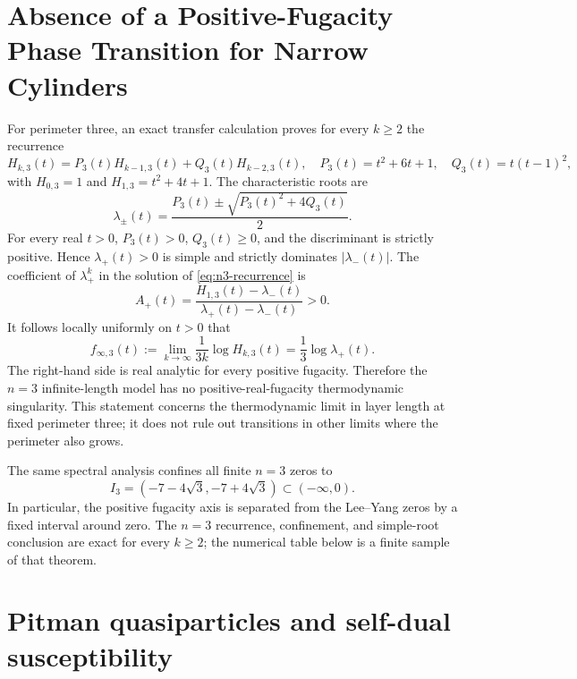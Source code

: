 \documentclass[11pt]{article}
\begin{document}
\section{Absence of a Positive-Fugacity Phase Transition for Narrow Cylinders}

For perimeter three, an exact transfer calculation proves for every $k\ge2$ the recurrence
\begin{equation}
  H_{k,3}(t)=P_3(t)H_{k-1,3}(t)+Q_3(t)H_{k-2,3}(t),
  \quad P_3(t)=t^2+6t+1,\quad Q_3(t)=t(t-1)^2,
  \label{eq:n3-recurrence}
\end{equation}
with $H_{0,3}=1$ and $H_{1,3}=t^2+4t+1$. The characteristic roots are
\begin{equation}
  \lambda_\pm(t)=\frac{P_3(t)\pm\sqrt{P_3(t)^2+4Q_3(t)}}{2}.
  \label{eq:n3-eigenvalues}
\end{equation}
For every real $t>0$, $P_3(t)>0$, $Q_3(t)\ge0$, and the discriminant is strictly positive. Hence $\lambda_+(t)>0$ is simple and strictly dominates $|\lambda_-(t)|$. The coefficient of $\lambda_+^k$ in the solution of \eqref{eq:n3-recurrence} is
\[
  A_+(t)=\frac{H_{1,3}(t)-\lambda_-(t)}{\lambda_+(t)-\lambda_-(t)}>0.
\]
It follows locally uniformly on $t>0$ that
\begin{equation}
  f_{\infty,3}(t):=\lim_{k\to\infty}\frac{1}{3k}\log H_{k,3}(t)
  =\frac13\log\lambda_+(t).
  \label{eq:free-energy-limit}
\end{equation}
The right-hand side is real analytic for every positive fugacity. Therefore the $n=3$ infinite-length model has no positive-real-fugacity thermodynamic singularity. This statement concerns the thermodynamic limit in layer length at fixed perimeter three; it does not rule out transitions in other limits where the perimeter also grows.

The same spectral analysis confines all finite $n=3$ zeros to
\begin{equation}
  I_3=(-7-4\sqrt3,-7+4\sqrt3)\subset(-\infty,0).
  \label{eq:i3}
\end{equation}
In particular, the positive fugacity axis is separated from the Lee--Yang zeros by a fixed interval around zero. The $n=3$ recurrence, confinement, and simple-root conclusion are exact for every $k\ge2$; the numerical table below is a finite sample of that theorem.

\section{Pitman quasiparticles and self-dual susceptibility}
\end{document}
